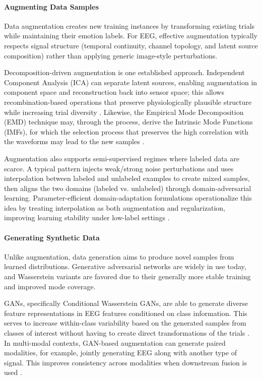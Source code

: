 \documentclass{WileyMSP-template}
\begin{document}
\paragraph{Augmenting Data Samples}
Data augmentation creates new training instances by transforming existing trials while maintaining their emotion labels. For EEG, effective augmentation typically respects signal structure (temporal continuity, channel topology, and latent source composition) rather than applying generic image-style perturbations.

Decomposition-driven augmentation is one established approach. Independent Component Analysis (ICA) can separate latent sources, enabling augmentation in component space and reconstruction back into sensor space; this allows recombination-based operations that preserve physiologically plausible structure while increasing trial diversity \cite{kang2019_ica_aug}. Likewise, the Empirical Mode Decomposition (EMD) technique may, through the process, derive the Intrinsic Mode Functions (IMFs), for which the selection process that preserves the high correlation with the waveforms may lead to the new samples \cite{singh2023_imf_aug}.

Augmentation also supports semi-supervised regimes where labeled data are scarce. A typical pattern injects weak/strong noise perturbations and uses interpolation between labeled and unlabeled examples to create mixed samples, then aligns the two domains (labeled vs. unlabeled) through domain-adversarial learning. Parameter-efficient domain-adaptation formulations operationalize this idea by treating interpolation as both augmentation and regularization, improving learning stability under low-label settings \cite{zhang2022_parse}.

\paragraph{Generating Synthetic Data}
Unlike augmentation, data generation aims to produce novel samples from learned distributions. Generative adversarial networks are widely in use today, and Wasserstein variants are favored due to their generally more stable training and improved mode coverage.

GANs, specifically Conditional Wasserstein GANs, are able to generate diverse feature representations in EEG features conditioned on class information. This serves to increase within-class variability based on the generated samples from classes of interest without having to create direct transformations of the trials \cite{luo2018_cwgan}. In multi-modal contexts, GAN-based augmentation can generate paired modalities, for example, jointly generating EEG along with another type of signal. This improves consistency across modalities when downstream fusion is used \cite{luo2019_gan_multimodal}.
\end{document}
